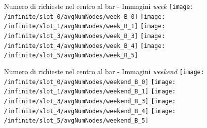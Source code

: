 \documentclass[xcolor=table]{beamer}
\begin{document}
\begin{frame}{Numero di richieste nel centro al bar - Immagini \textit{week}}\justifying
\centering
\texttt{[image: /infinite/slot\_0/avgNumNodes/week\_B\_0]}
\texttt{[image: /infinite/slot\_1/avgNumNodes/week\_B\_1]}
\texttt{[image: /infinite/slot\_3/avgNumNodes/week\_B\_3]}
\texttt{[image: /infinite/slot\_4/avgNumNodes/week\_B\_4]}
\texttt{[image: /infinite/slot\_5/avgNumNodes/week\_B\_5]}
\end{frame}
\begin{frame}{Numero di richieste nel centro al bar - Immagini \textit{weekend}}\justifying
\centering
\texttt{[image: /infinite/slot\_0/avgNumNodes/weekend\_B\_0]}
\texttt{[image: /infinite/slot\_1/avgNumNodes/weekend\_B\_1]}
\texttt{[image: /infinite/slot\_3/avgNumNodes/weekend\_B\_3]}
\texttt{[image: /infinite/slot\_4/avgNumNodes/weekend\_B\_4]}
\texttt{[image: /infinite/slot\_5/avgNumNodes/weekend\_B\_5]}
\end{frame}
\end{document}

